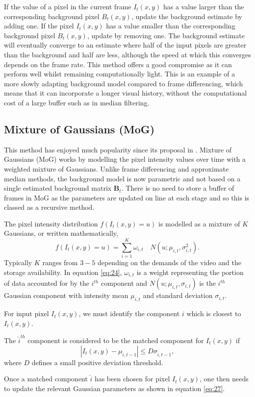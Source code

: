 If the value of a pixel in the current frame $I_t(x,y)$ has a value larger than the corresponding background pixel $B_t(x,y)$, update the background estimate by adding one. 
If the pixel $I_t(x,y)$ has a value smaller than the corresponding background pixel $B_t(x,y)$, update by removing one. The background estimate will eventually converge to an estimate where half of the input pixels are greater than the background and half are less, although the speed at which this converges depends on the frame rate. This method offers a good compromise as it can perform well whilst remaining computationally light. This is an example of a more slowly adapting background model compared to frame differencing, which means that it can incorporate a longer visual history, without the computational cost of a large buffer such as in median filtering.

\subsection{Mixture of Gaussians (MoG)}
\label{sec:mixt-gauss-mog}
This method has enjoyed much popularity since its proposal in \cite{friedman1997image}. Mixture of Gaussians (MoG) works by modelling the pixel intensity values over time with a weighted mixture of Gaussians. Unlike frame differencing and approximate median methods, the background model is now parametric and not based on a single estimated background matrix $\pmb{B}_t$. There is no need to store a buffer of frames in MoG as the parameters are updated on line at each stage and so this is classed as a recursive method. 

The pixel intensity distribution $f(I_t(x,y) = u)$ is modelled  as a mixture of $K$ Gaussians, or written mathematically,
%
\begin{equation}
  \label{eq:24}
  f(I_t(x,y) = u) = \sum_{i=1}^K \omega_{i,t} \quad N(u; \mu_{i,t}, \sigma_{i,t}^2).
\end{equation}
%
Typically $K$ ranges from $3 - 5$ depending on the demands of the video and the storage availability. In equation \eqref{eq:24}, $\omega_{i,t}$ is a weight representing the portion of data accounted for by the $i^{th}$ component and $N (u;\mu_{i,t}, \sigma_{i,t})$ is the $i^{th}$ Gaussian component with intensity mean $\mu_{i,t}$ and standard deviation $\sigma_{i,t}$.

For input pixel $I_t(x,y)$, we must identify the component $i$ which is closest to $I_t(x,y)$.

\begin{definition}
The $\hat{i}^{th}$ component is considered to be the matched component for $I_t(x,y)$ if
\begin{equation}
  \label{eq:6}
  |I_t(x,y) - \mu_{\hat{i},t-1}| \leq D \sigma_{\hat{i},t-1},
\end{equation}
where $D$ defines a small positive deviation threshold. 
\end{definition}
Once a matched component $\hat{i}$ has been chosen for pixel $I_t(x,y)$, one then needs to update the relevant Gaussian parameters as shown in equation \eqref{eq:27}.

